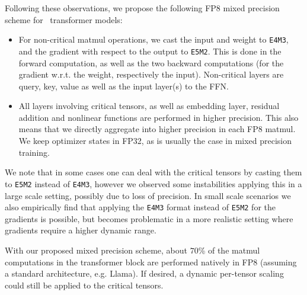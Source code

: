 Following these observations, we propose the following FP8 mixed precision scheme for \umup\ transformer models:
\begin{itemize}
    \item For non-critical matmul operations, we cast the input and weight to \texttt{E4M3}, and the gradient with respect to the output to \texttt{E5M2}. This is done in the forward computation, as well as the two backward computations (for the gradient w.r.t. the weight, respectively the input). Non-critical layers are query, key, value as well as the input layer(s) to the FFN.
    \item All layers involving critical tensors, as well as embedding layer, residual addition and nonlinear functions are performed in higher precision. This also means that we directly aggregate into higher precision in each FP8 matmul. We keep optimizer states in FP32, as is usually the case in mixed precision training. 
\end{itemize}
We note that in some cases one can deal with the critical tensors by casting them to \texttt{E5M2} instead of \texttt{E4M3}, however we observed some instabilities applying this in a large scale setting, possibly due to loss of precision. In small scale scenarios we also empirically find that applying the \texttt{E4M3} format instead of \texttt{E5M2} for the gradients is possible, but becomes problematic in a more realistic setting where gradients require a higher dynamic range. 

With our proposed mixed precision scheme, about $70$\% of the matmul computations in the transformer block are performed natively in FP8 (assuming a standard architecture, e.g. Llama). If desired, a dynamic per-tensor scaling could still be applied to the critical tensors.




